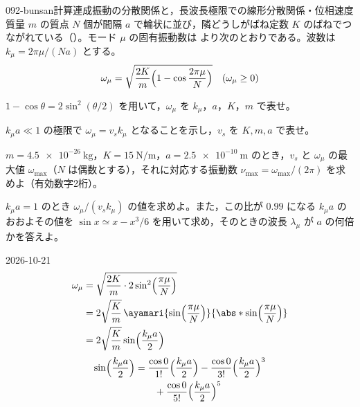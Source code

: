 \documentclass[uplatex,dvipdfmx,a4paper,11pt]{jsarticle}
\begin{document}
\mondaihen
{}
\begin{mondai}{092-bunsan}{計算}{連成振動の分散関係と，長波長極限での線形分散関係・位相速度}
質量 $m$ の質点 $N$ 個が間隔 $a$ で輪状に並び，隣どうしがばね定数 $K$ のばねでつながれている（）。モード $\mu$ の固有振動数は  より次のとおりである。波数は $k_\mu=2\pi\mu/(Na)$ とする。
  \[ \omega_\mu=\sqrt{\frac{2K}{m}\Bigl(1-\cos\frac{2\pi\mu}{N}\Bigr)}\quad(\omega_\mu\ge0) \]
  \begin{shoumon}
    \item $1-\cos\theta=2\sin^{2}(\theta/2)$ を用いて，$\omega_\mu$ を $k_\mu$，$a$，$K$，$m$ で表せ。
    \item $k_\mu a\ll1$ の極限で $\omega_\mu=v_sk_\mu$ となることを示し，$v_s$ を $K,m,a$ で表せ。
    \item $m=\qty{4.5e-26}{\kilogram}$，$K=\qty{15}{\newton\per\metre}$，$a=\qty{2.5e-10}{\metre}$ のとき，$v_s$ と $\omega_\mu$ の最大値 $\omega_{\max}$（$N$ は偶数とする），それに対応する振動数 $\nu_{\max}=\omega_{\max}/(2\pi)$ を求めよ（有効数字2桁）。
    \item $k_\mu a=1$ のとき $\omega_\mu/(v_sk_\mu)$ の値を求めよ。また，この比が $0.99$ になる $k_\mu a$ のおおよその値を $\sin x\simeq x-x^{3}/6$ を用いて求め，そのときの波長 $\lambda_\mu$ が $a$ の何倍かを答えよ。
  \end{shoumon}
\begin{kotaeutsushi}{2026-10-21}
\begin{align*}
  \omega_\mu&=\sqrt{\frac{2K}{m}\cdot2\sin^{2}\Bigl(\frac{\pi\mu}{N}\Bigr)}\\
  &=2\sqrt{\frac{K}{m}}\,\ayamari{\sin\Bigl(\frac{\pi\mu}{N}\Bigr)}{\abs*{\sin\Bigl(\frac{\pi\mu}{N}\Bigr)}}\\
  &=2\sqrt{\frac{K}{m}}\sin\Bigl(\frac{k_\mu a}{2}\Bigr)
\end{align*}
\begin{align*}
  \sin\Bigl(\frac{k_\mu a}{2}\Bigr)&=\frac{\cos0}{1!}\Bigl(\frac{k_\mu a}{2}\Bigr)-\frac{\cos0}{3!}\Bigl(\frac{k_\mu a}{2}\Bigr)^{3}\\
  &\qquad+\frac{\cos0}{5!}\Bigl(\frac{k_\mu a}{2}\Bigr)^{5}\\

\end{align*}
\end{kotaeutsushi}
\end{mondai}
\end{document}

